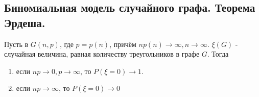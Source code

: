 \subsection{Биномиальная модель случайного графа. Теорема Эрдеша.}


\begin{theorem} 
Пусть в $G(n, p)$, где $p = p(n)$, причём $np(n) \to \infty, n \to \infty$. $\xi(G)$ - случайная величина, равная количеству треугольников в графе $G$. Тогда\\
\begin{enumerate}
    \item если $np \to 0, p \to \infty$, то $P(\xi = 0) \to 1.$
    \item если $np \to \infty$, то $P(\xi = 0) \to 0$
\end{enumerate}
\end{theorem}

